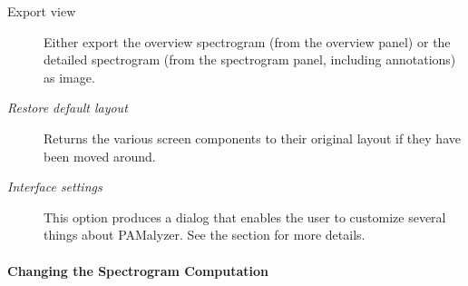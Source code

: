 \documentclass{scrartcl}
\begin{document}
\begin{description}
\item [Export view] Either export the overview spectrogram (from the overview panel) or the detailed spectrogram (from the spectrogram panel, including annotations) as image.
\item [\textit{Restore default layout}] Returns the various screen components to their original layout if they have been moved around. 
\item [\textit{Interface settings}] This option produces a dialog that enables the user to customize several things about PAMalyzer. 
	See the section  for more details.
\end{description}


\paragraph{Changing the Spectrogram Computation}\label{sec:spectrogram2}
\end{document}
